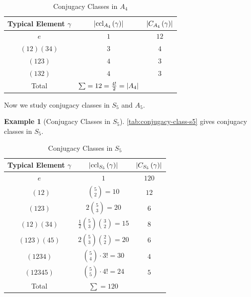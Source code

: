 \documentclass{article}
\theoremstyle{definition}
\newtheorem*{example*}{Example}
\theoremstyle{remark}
\DeclarePairedDelimiter{\abs}{\lvert}{\rvert}
\newcommand{\pqty}[1]{\left(#1\right)}
\newcommand{\perm}[1]{(#1)}
\newcommand{\ccl}{\operatorname{ccl}}
\begin{document}
\begin{table}[ht!]
    \centering
    \begin{tabular}{ccc}
        Typical Element \(\gamma\) & \(\abs{\ccl_{A_4} \pqty{\gamma}}\) & \(\abs{C_{A_4} \pqty{\gamma}}\)\\
        \hline\hline
        \(e\) & \(1\) & \(12\) \\
        \(\perm{12} \perm{34}\) & \(3\) & \(4\) \\
        \(\perm{123}\) & \(4\) & \(3\) \\
        \(\perm{132}\) & \(4\) & \(3\) \\
        \hline
        Total & \(\sum = 12 = \frac{4!}{2} = \abs{A_4}\)
    \end{tabular}
    \caption{Conjugacy Classes in \(A_4\)}
    \label{tab:conjugacy-class-a4}
\end{table}

Now we study conjugacy classes in \(S_5\) and \(A_5\).

\begin{example*}[Conjugacy Classes in \(S_5\)]
    \autoref{tab:conjugacy-class-s5} gives conjugacy classes in \(S_5\).
\end{example*}

\begin{table}[ht!]
    \centering
    \begin{tabular}{ccc}
        Typical Element \(\gamma\) & \(\abs{\ccl_{S_5} \pqty{\gamma}}\) & \(\abs{C_{S_5} \pqty{\gamma}}\)\\
        \hline\hline
        \(e\) & \(1\) & \(120\) \\\
        \(\perm{12}\) & \(\binom{5}{2} = 10\) & \(12\) \\
        \(\perm{123}\) & \(2 \binom{5}{3} = 20\) & \(6\) \\
        \(\perm{12} \perm{34}\) & \(\frac{1}{2} \binom{5}{3} \binom{3}{2} = 15\) & \(8\) \\
        \(\perm{123} \perm{45}\) & \(2 \binom{5}{3} \binom{2}{2} = 20\) & \(6\) \\
        \(\perm{1234}\) & \(\binom{5}{4} \cdot 3! = 30\) & \(4\) \\
        \(\perm{12345}\) & \(\binom{5}{5} \cdot 4! = 24\) & \(5\) \\
        \hline
        Total & \(\sum = 120\) &
    \end{tabular}
    \caption{Conjugacy Classes in \(S_5\)}
    \label{tab:conjugacy-class-s5}
\end{table}
\end{document}
